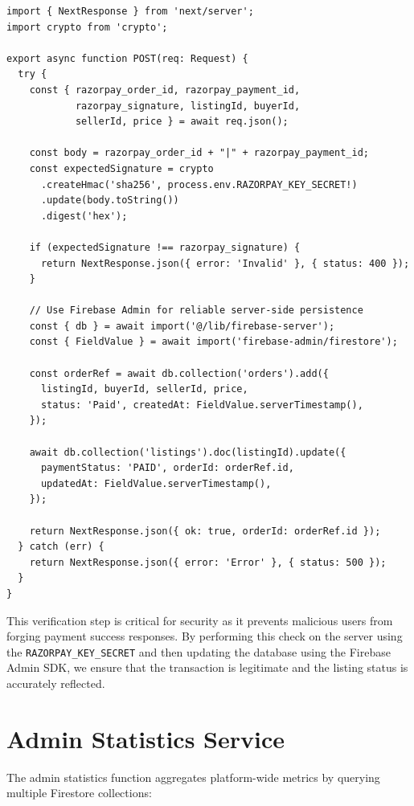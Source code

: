 \documentclass[a4paper,12pt,oneside]{report}
\begin{document}
\begin{lstlisting}[caption={Razorpay Payment Verification (api/razorpay/verify/route.ts)}, label={lst:paymentverify}]
import { NextResponse } from 'next/server';
import crypto from 'crypto';

export async function POST(req: Request) {
  try {
    const { razorpay_order_id, razorpay_payment_id, 
            razorpay_signature, listingId, buyerId, 
            sellerId, price } = await req.json();

    const body = razorpay_order_id + "|" + razorpay_payment_id;
    const expectedSignature = crypto
      .createHmac('sha256', process.env.RAZORPAY_KEY_SECRET!)
      .update(body.toString())
      .digest('hex');

    if (expectedSignature !== razorpay_signature) {
      return NextResponse.json({ error: 'Invalid' }, { status: 400 });
    }

    // Use Firebase Admin for reliable server-side persistence
    const { db } = await import('@/lib/firebase-server');
    const { FieldValue } = await import('firebase-admin/firestore');
    
    const orderRef = await db.collection('orders').add({
      listingId, buyerId, sellerId, price,
      status: 'Paid', createdAt: FieldValue.serverTimestamp(),
    });

    await db.collection('listings').doc(listingId).update({
      paymentStatus: 'PAID', orderId: orderRef.id,
      updatedAt: FieldValue.serverTimestamp(),
    });

    return NextResponse.json({ ok: true, orderId: orderRef.id });
  } catch (err) {
    return NextResponse.json({ error: 'Error' }, { status: 500 });
  }
}
\end{lstlisting}

\noindent This verification step is critical for security as it prevents malicious users from forging payment success responses. By performing this check on the server using the \texttt{RAZORPAY\_KEY\_SECRET} and then updating the database using the Firebase Admin SDK, we ensure that the transaction is legitimate and the listing status is accurately reflected.

\section{Admin Statistics Service}

\noindent The admin statistics function aggregates platform-wide metrics by querying multiple Firestore collections:
\end{document}

